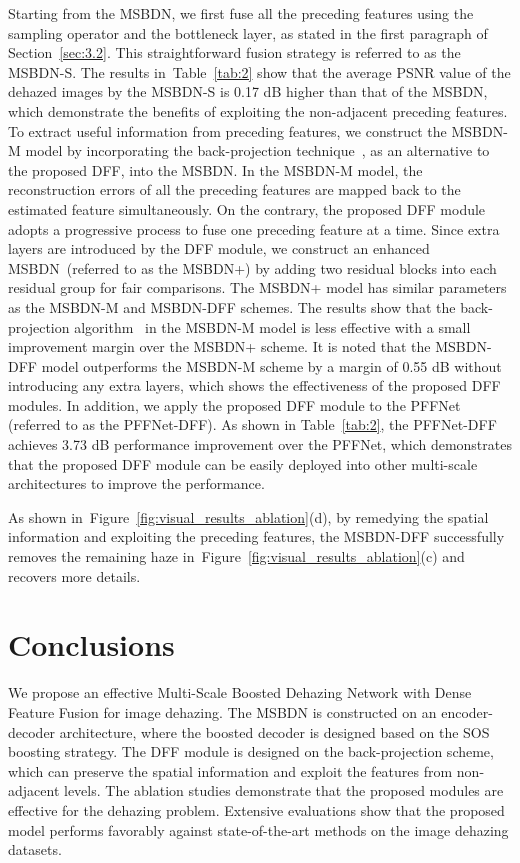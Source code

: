 \documentclass[10pt,twocolumn,letterpaper]{article}
\newcommand{\secref}[1]{Section~\ref{sec:#1}}
\newcommand{\figref}[1]{Figure~\ref{fig:#1}}
\newcommand{\tabref}[1]{Table~\ref{tab:#1}}
\begin{document}
  Starting from the MSBDN, we first fuse all the preceding features using the sampling operator and the bottleneck layer, as stated in the first paragraph of \secref{3.2}.
This straightforward fusion strategy is referred to as the MSBDN-S.
The results in~\tabref{2} show that the average PSNR value of the dehazed images by
  the MSBDN-S is 0.17 dB higher than that of the MSBDN,
  which demonstrate the benefits of exploiting the non-adjacent preceding features.
To extract useful information from preceding features, we construct the MSBDN-M model by incorporating the back-projection technique~\cite{Irani1991}, as an alternative to the proposed DFF, into the MSBDN.
In the MSBDN-M model, the reconstruction errors of all the preceding features are mapped back to the estimated feature simultaneously.
On the contrary, the proposed DFF module adopts a progressive process to fuse one preceding feature at a time.
Since extra layers are introduced by the DFF module,
  we construct an enhanced MSBDN~(referred to as the MSBDN+) by adding two residual blocks into each residual group for fair comparisons.
The MSBDN+ model has similar parameters as the MSBDN-M and MSBDN-DFF schemes.
The results show that the back-projection algorithm~\cite{Irani1991} in the MSBDN-M model is less effective with a small improvement margin over the MSBDN+ scheme.
It is noted that the MSBDN-DFF model outperforms the MSBDN-M scheme by a margin of 0.55 dB without introducing any extra layers,
  which shows the effectiveness of the proposed DFF modules.
In addition, we apply the proposed DFF module to the PFFNet (referred to as the PFFNet-DFF).
As shown in \tabref{2}, the PFFNet-DFF achieves 3.73 dB performance improvement over the PFFNet,
  which demonstrates that the proposed DFF module can be easily deployed into other multi-scale architectures to improve the performance.
  
  As shown in~\figref{visual_results_ablation}(d),
by remedying the spatial information and exploiting the preceding features, the MSBDN-DFF successfully removes the remaining haze in~\figref{visual_results_ablation}(c) and recovers more details.


  
  
  
  \section{Conclusions}
  We propose an effective Multi-Scale Boosted Dehazing Network with Dense Feature Fusion for image dehazing.
The MSBDN is constructed on an encoder-decoder architecture, where the boosted decoder is designed based on the SOS boosting strategy.
The DFF module is designed on the back-projection scheme, which can preserve the spatial information and exploit the features from non-adjacent levels.
The ablation studies demonstrate that the proposed modules are effective for the dehazing problem.
Extensive evaluations show that the proposed model performs favorably against state-of-the-art methods on the image dehazing datasets.
\end{document}

